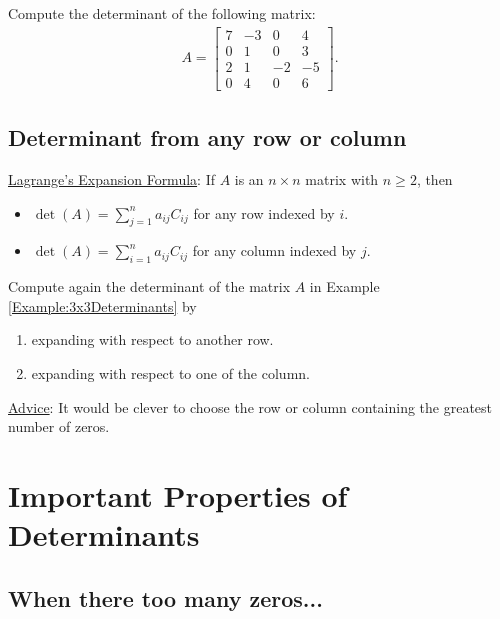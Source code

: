 \documentclass[12pt,a4paper]{article}
\newcounter{example}[section]
\begin{document}
		\begin{example}\label{Example:4x4Determinant}
		Compute the determinant of the following matrix:
			\begin{align*}
			A = \begin{bmatrix}
			7 & -3 & 0 & 4 \\
			0 & 1 & 0 & 3 \\
			2 & 1 & -2 & -5 \\
			0 & 4 & 0 & 6
			\end{bmatrix} .
			\end{align*}
		\end{example}
		
	\newpage
	
	\subsection{Determinant from any row or column}
	
	\noindent\underline{Lagrange's Expansion Formula}:
	If $A$ is an $n \times n$ matrix with $n \geq 2$, then
		\begin{itemize}
		\item $\det (A) = \sum_{j = 1}^n a_{ij} C_{ij}$ for any row indexed by $i$.
		\item $\det (A) = \sum_{i = 1}^n a_{ij} C_{ij}$ for any column indexed by $j$.
		\end{itemize}
	
	\begin{example}
	Compute again the determinant of the matrix $A$ in Example \ref{Example:3x3Determinants} by
		\begin{enumerate}
		\item expanding with respect to another row.
		\item expanding with respect to one of the column.
		\end{enumerate}
	\end{example}
	
	\vfill
	
	\noindent\underline{Advice}: It would be clever to choose the row or column containing the greatest number of zeros.
	
	\newpage
	
\section{Important Properties of Determinants}

	\subsection{When there too many zeros...}
		
\end{document}
